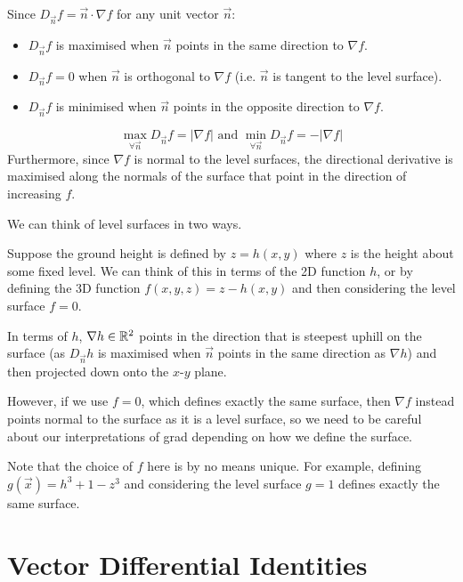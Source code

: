 \documentclass[../main.tex]{subfiles}
\begin{document}
Since $D_{\vec{n}} f = \vec{n} \cdot \nabla f$ for any unit vector $\vec{n}$:
\begin{itemize}
  \item $D_{\vec{n}}f$ is maximised when $\vec{n}$ points in the same direction to $\nabla f$.
  \item $D_{\vec{n}}f = 0$ when $\vec{n}$ is orthogonal to $\nabla f$ (i.e. $\vec{n}$ is tangent to the level surface).
  \item $D_{\vec{n}}f$ is minimised when $\vec{n}$ points in the opposite direction to $\nabla f$.
\end{itemize}
\[
  \max_{\forall \vec{n}} D_{\vec{n}}f = |\nabla f| \text{ and } \min_{\forall \vec{n}} D_{\vec{n}}f = -|\nabla f|
\]
Furthermore, since $\nabla f$ is normal to the level surfaces, the directional derivative is maximised along the normals of the surface that point in the direction of increasing $f$.

\begin{remark}
  We can think of level surfaces in two ways.

  Suppose the ground height is defined by $z = h(x, y)$ where $z$ is the height about some fixed level.
  We can think of this in terms of the 2D function $h$, or by defining the 3D function $f(x, y, z) = z - h(x, y)$ and then considering the level surface $f = 0$.

  In terms of $h$, $\nabla h \in \mathbb{R}^2$ points in the direction that is steepest uphill on the surface (as $D_{\vec{n}} h$ is maximised when $\vec{n}$ points in the same direction as $\nabla h$) and then projected down onto the $x$-$y$ plane.

  However, if we use $f = 0$, which defines exactly the same surface, then $\nabla f$ instead points normal to the surface as it is a level surface, so we need to be careful about our interpretations of grad depending on how we define the surface.

  Note that the choice of $f$ here is by no means unique.
  For example, defining $g(\vec{x}) = h^3 + 1 - z^3$ and considering the level surface $g = 1$ defines exactly the same surface.
\end{remark}
\section{Vector Differential Identities}
\label{vectorIdentities}
\end{document}

